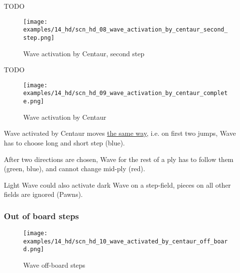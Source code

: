 \huge{}
TODO
\normalsize{}

\clearpage %

\noindent
\begin{figure}[!h]
\texttt{[image: examples/14\_hd/scn\_hd\_08\_wave\_activation\_by\_centaur\_second\_step.png]}
\caption{Wave activation by Centaur, second step}
\label{fig:scn_hd_08_wave_activation_by_centaur_second_step}
\end{figure}

\huge{}
TODO
\normalsize{}

\clearpage %

\noindent
\begin{figure}[!h]
\texttt{[image: examples/14\_hd/scn\_hd\_09\_wave\_activation\_by\_centaur\_complete.png]}
\caption{Wave activation by Centaur}
\label{fig:scn_hd_09_wave_activation_by_centaur_complete}
\end{figure}

Wave activated by Centaur moves \hyperref[fig:scn_hd_03_centaur_multi_step_init]{the same way},
i.e. on first two jumps, Wave has to choose long and short step (blue).

After two directions
are chosen, Wave for the rest of a ply has to follow them (green, blue), and cannot change mid-ply
(red).

Light Wave could also activate dark Wave on a step-field, pieces on all other fields are
ignored (Pawns).

\clearpage %

\subsubsection*{Out of board steps}

\vspace*{-1.2\baselineskip}
\noindent
\begin{figure}[!h]
\texttt{[image: examples/14\_hd/scn\_hd\_10\_wave\_activated\_by\_centaur\_off\_board.png]}
\caption{Wave off-board steps}
\label{fig:scn_hd_10_wave_activated_by_centaur_off_board}
\end{figure}

